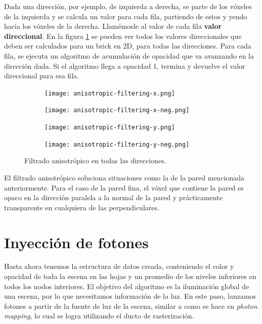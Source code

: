 Dada una dirección, por ejemplo, de izquierda a derecha, se parte de los vóxeles de la izquierda y se calcula un valor para cada fila, partiendo de estos y yendo hacia los vóxeles de la derecha.
Llamémosle al valor de cada fila \textbf{valor direccional}.
En la figura \ref{fig:svo_filtering_anisotropic} se pueden ver todos los valores direccionales que deben ser calculados para un brick en 2D, para todas las direcciones.
Para cada fila, se ejecuta un algoritmo de acumulación de opacidad que va avanzando en la dirección dada.
Si el algoritmo llega a opacidad 1, termina y devuelve el valor direccional para esa fila.

\begin{figure}
    \begin{center}
        \begin{subfigure}{.24\textwidth}
            \texttt{[image: anisotropic-filtering-x.png]}
        \end{subfigure}
        \begin{subfigure}{.24\textwidth}
            \texttt{[image: anisotropic-filtering-x-neg.png]}
        \end{subfigure}
        \begin{subfigure}{.24\textwidth}
            \texttt{[image: anisotropic-filtering-y.png]}
        \end{subfigure}
        \begin{subfigure}{.24\textwidth}
            \texttt{[image: anisotropic-filtering-y-neg.png]}
        \end{subfigure}
    \end{center}
    \caption{Filtrado anisotrópico en todas las direcciones.}
    \label{fig:svo_filtering_anisotropic}
\end{figure}

El filtrado anisotrópico soluciona situaciones como la de la pared mencionada anteriormente.
Para el caso de la pared fina, el vóxel que contiene la pared es opaco en la dirección paralela a la normal de la pared y prácticamente transparente en cualquiera de las perpendiculares.

\section{Inyección de fotones}\label{sec:photon-injection}

Hasta ahora tenemos la estructura de datos creada, conteniendo el color y opacidad de toda la escena en las hojas y un promedio de los niveles inferiores en todos los nodos interiores.
El objetivo del algoritmo es la iluminación global de una escena, por lo que necesitamos información de la luz.
En este paso, lanzamos fotones a partir de la fuente de luz de la escena, similar a como se hace en \textit{photon mapping}, lo cual se logra utilizando el ducto de rasterización.


